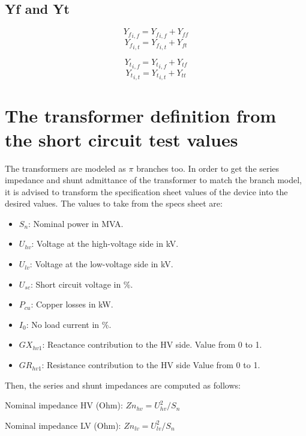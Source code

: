 \documentclass[11pt,fleqn]{book} %
\begin{document}
\subsection{Yf and Yt}

$${Y_f}_{i, f} = {Y_f}_{i, f} + Y_{ff}$$
$${Y_f}_{i, t} = {Y_f}_{i, t} + Y_{ft}$$

$${Y_t}_{i, f} = {Y_t}_{i, f} + Y_{tf}$$
$${Y_t}_{i, t} = {Y_t}_{i, t} + Y_{tt}$$


\section{The transformer definition from the short circuit test values}

The transformers are modeled as $\pi$ branches too. In order to get the series impedance and shunt admittance of the transformer to match the branch model, it is advised to transform the specification sheet values of the device into the desired values. The values to take from the specs sheet are:
\begin{itemize}
	\item $S_n$: Nominal power in MVA.
	\item $U_{hv}$: Voltage at the high-voltage side in kV.
	\item $U_{lv}$: Voltage at the low-voltage side in kV.
	\item $U_{sc}$: Short circuit voltage in \%.
	\item $P_{cu}$: Copper losses in kW.
	\item $I_0$: No load current in \%.
	\item $GX_{hv1}$: Reactance contribution to the HV side. Value from 0 to 1.
	\item $GR_{hv1}$: Resistance contribution to the HV side Value from 0 to 1.\newline
\end{itemize}

Then, the series and shunt impedances are computed as follows:

Nominal impedance HV (Ohm): $Zn_{hv} = U_{hv}^2 / S_n$ \newline


Nominal impedance LV (Ohm): $Zn_{lv} = U_{lv}^2 / S_n$ \newline
\end{document}
